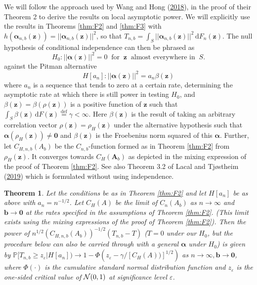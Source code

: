 \documentclass[
  12pt,
  letterpaper]{article}
\newtheorem{thm}{Theorem}[section]
\numberwithin{equation}{section}
\newcommand{\z}{\bm{z}}
\newcommand{\fA}{\bm{A}}
\newcommand{\bb}{\bm{b}}
\newcommand{\falpha}{\bm{\alpha}}
\newcommand{\di}{\,\textrm{d}}
\begin{document}
We will follow the approach used by Wang and Hong (\protect\hyperlink{ref-wang2017characteristic}{2018}), in the proof of their Theorem 2 to derive the results on local asymptotic power. We will explicitly use the results in Theorems \ref{thm:F2} and \ref{thm:F3} with \(h({\falpha}_{n,b}(\z)) = ||{\falpha}_{n,b}(\z)||^2\), so that \(T_{n,b} = \int _S||{\falpha}_{n,b}(\z)||^2 \di F_n(\z)\). The null hypothesis of conditional independence can then be phrased as
\[
H_0: ||{\falpha(\z)}||^2 =  0 \;\; \mbox{for} \;\;\z \;\; \mbox{almost everywhere in} \;\;S. 
\]
against the Pitman alternative
\[
H[a_n]: ||{\falpha(\z)}||^2 = a_n\beta(\z)
\]
where \(a_n\) is a sequence that tends to zero at a certain rate, determining the asymptotic rate at which there is still power in testing \(H_0\), and \(\beta (\z) =\beta(\rho(\z))\) is a positive function of \(\z\) such that \(\int_S \beta(\z) \di F(\z) \stackrel{\textrm{def}}{=} \gamma < \infty\). Here \(\beta(\z)\) is the result of taking an arbitrary correlation vector \(\rho(\z) = \rho_H(\z)\) under the alternative hypothesis such that \({\falpha}(\rho_H(\z)) \neq {\bm{0}}\) and \(\beta(\z)\) is the Froebenius norm squared of this \({\falpha}\). Further, let \(C_{H,n,b}(A_b)\) be the \(C_{n,b}\)-function formed as in Theorem \ref{thm:F2} from \(\rho_H(\z)\). It converges towards \(C_{H}(\fA_b)\) as depicted in the mixing expression of the proof of Theorem \ref{thm:F2}. See also Theorem 3.2 of Lacal and Tjøstheim (\protect\hyperlink{ref-lacal2018estimating}{2019}) which is formulated without using independence.

\begin{thm}
Let the conditions be as in Theorem \ref{thm:F2} and let $H[a_n]$ be as above with $a_n =n^{-1/2}$. Let $C_H(A)$ be the limit of $C_n(A_b)$ as $n \to \infty$ and $\bb \to \bm{0}$ at the rates specified in the assumptions of Theorem \ref{thm:F2}. (This limit exists using the mixing expressions of the proof of Theorem \ref{thm:F2}). Then the power of $n^{1/2}(C_{H,n,b}(A_b))^{-1/2}(T_{n,b}-T)$ ($T = 0$ under our $H_0$, but the procedure below can also be carried through with a general ${\falpha}$ under $H_0$) is given by $\mathbb{P}[T_{n,b} \geq z_{\varepsilon}|H[a_n]) \to 1-\Phi(z_{\varepsilon}-\gamma/[C_{H}(A))]^{1/2})$ as $n \to \infty, \bb \to \bm{0}$, where $\Phi(\cdot)$ is the cumulative standard normal distribution function and $z_{\varepsilon}$ is the one-sided critical value of ${\cal N}(0,1)$ at significance level $\varepsilon$.
\label{thm:G1}
\end{thm}
\end{document}
